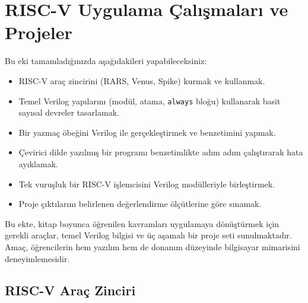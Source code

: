 \chapter{RISC-V Uygulama Çalışmaları ve Projeler}
\label{app:pratik-rehber}

\begin{tcolorbox}[
    colback=blokyesil!15,
    colframe=sinyalyesil!60!black,
    title={\textbf{Öğrenme Hedefleri}},
    fonttitle=\bfseries,
    rounded corners,
    boxrule=0.8pt
]
Bu eki tamamladığınızda aşağıdakileri yapabileceksiniz:
\begin{itemize}[nosep, leftmargin=*]
    \item RISC-V araç zincirini (RARS, Venus, Spike) kurmak ve kullanmak.
    \item Temel Verilog yapılarını (modül, atama, \texttt{always} bloğu) kullanarak basit sayısal devreler tasarlamak.
    \item Bir yazmaç öbeğini Verilog ile gerçekleştirmek ve benzetimini yapmak.
    \item Çevirici dilde yazılmış bir programı benzetimlikte adım adım çalıştırarak hata ayıklamak.
    \item Tek vuruşluk bir RISC-V işlemcisini Verilog modülleriyle birleştirmek.
    \item Proje çıktılarını belirlenen değerlendirme ölçütlerine göre sınamak.
\end{itemize}
\end{tcolorbox}

Bu ekte, kitap boyunca öğrenilen kavramları uygulamaya dönüştürmek için gerekli araçlar, temel Verilog bilgisi ve üç aşamalı bir proje seti sunulmaktadır. Amaç, öğrencilerin hem yazılım hem de donanım düzeyinde bilgisayar mimarisini deneyimlemesidir.

\section{RISC-V Araç Zinciri}
\label{sec:ekd-arac-zinciri}

